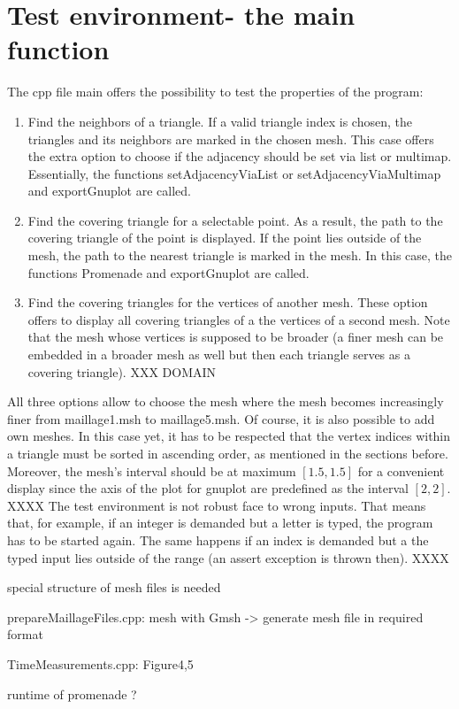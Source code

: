 \documentclass[10pt]{article}
\begin{document}
\section{Test environment- the main function}
	The cpp file main offers the possibility to test the properties of the program:
	\begin{enumerate}
		\item 
		Find the neighbors of a triangle.
		If a valid triangle index is chosen, the triangles and its neighbors are marked in the chosen mesh. This case offers the extra option to choose if the adjacency should be set via list or multimap. Essentially, the functions 
		{\ttfamily setAdjacencyViaList } or {\ttfamily setAdjacencyViaMultimap} and {\ttfamily exportGnuplot} are called. 
		\item 
		Find the covering triangle for a selectable point. 
		As a result, the path to the covering triangle of the point is displayed. 
		If the point lies outside of the mesh, the path to the nearest triangle is marked in the mesh. 
		In this case, the functions {\ttfamily Promenade} and {\ttfamily exportGnuplot} are called. 
		\item 
		Find the covering triangles for the vertices of another mesh. These option offers to display all covering triangles of a the vertices of a second mesh. Note that the mesh whose vertices is supposed to be broader (a finer mesh can be embedded in a broader mesh as well but then each triangle serves as a covering triangle). XXX DOMAIN
	\end{enumerate}
	All three options allow to choose the mesh where the mesh becomes increasingly finer from maillage1.msh to maillage5.msh. 
	Of course, it is also possible to add own meshes. In this case yet, it has to be respected that the vertex indices within a triangle must be sorted in ascending order, as mentioned in the sections before. 
	Moreover, the mesh's interval should be at maximum $ [1.5,1.5] $ for a convenient display since the axis of the plot for gnuplot are predefined as the interval $ [2,2] $.  \\
	XXXX
	The test environment is not robust face to wrong inputs. That means that, for example, if an integer is demanded but a letter is typed, the program has to be started again. The same happens if an index is demanded but a the typed input lies outside of the range (an assert exception is thrown then).  
	XXXX
	 
	special structure of mesh files is needed
	
	prepareMaillageFiles.cpp: mesh with Gmsh -> generate mesh file in required format
	
	TimeMeasurements.cpp: Figure4,5
	
	runtime of promenade ?
	
\end{document}
